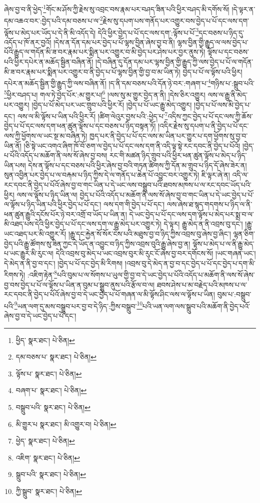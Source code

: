 ཞེས་བྱ་བ་ནི་ཕྱེད་\footnote{ཕྱིད་  སྣར་ཐང་།  པེ་ཅིན། }གོང་མ་ཤོས་ཀྱི་རྗེས་སུ་འབྲང་བས་རྣམ་པར་བཤད་ཟིན་པའི་ཕྱིར་བཤད་མི་དགོས་སོ། །དེ་ལྟར་ན་དམ་འཆའ་བར་:བྱེད་པའི་དམ་བཅས་པ་ལ་\footnote{དམ་བཅས་པ་  སྣར་ཐང་།  པེ་ཅིན། }རྗེས་སུ་དཔག་པས་གནོད་པར་འགྱུར་བས་བྱེད་པ་པོ་དང་ལས་དག་ལྟོས་པ་མེད་པར་ཡོད་པ་དེ་ནི་མི་འདོད་དེ། དེའི་ཕྱིར་བྱེད་པ་པོ་དང་ལས་དག་:ལྟོས་པ་པོ་\footnote{ལྟོས་པ་  སྣར་ཐང་།  པེ་ཅིན། }དང་བཅས་པ་ཉིད་དུ་འདོད་པ་ཁོ་ནར་བྱའོ། །དེས་ན་དོན་དམ་པར་བྱེད་པ་པོ་ལྷས་བྱིན་ཞེས་བྱ་བ་ནི། ལྷས་བྱིན་གྱི་རྒྱུད་ལ་ལས་བྱེད་པ་པོའི་རྒྱུད་ལ་གདོན་མི་ཟ་བར་རྣམ་པར་སྨིན་པར་འགྱུར་བ་མི་བྱེད་པར་ཤེས་པར་བྱར་ནུས་ཏེ། ལྟོས་པ་དང་བཅས་པའི་ཕྱིར་དཔེར་ན་མཆོད་སྦྱིན་བཞིན་ནོ། །དེ་བཞིན་དུ་དོན་དམ་པར་ལྷས་བྱིན་གྱི་རྒྱུད་ཀྱི་ལས་བྱེད་པ་པོ་ལ་གདོན་མི་ཟ་བར་རྣམ་པར་སྨིན་པར་འགྱུར་བ་ནི་བྱེད་པ་པོ་ལྷས་བྱིན་གྱི་བྱ་བ་མ་ཡིན་ཏེ། བྱེད་པ་པོ་ལ་ལྟོས་པའི་ཕྱིར། དཔེར་ན་མཆོད་སྦྱིན་གྱི་རྒྱུད་ཀྱི་ལས་བཞིན་ནོ། །ད་ནི་དམ་བཅས་པའི་དོན་ཉེ་བར་:གཞག་པ་\footnote{བཞག་པ་  སྣར་ཐང་།  པེ་ཅིན། }གཉིས་པ་:སྒྲུབ་པའི་\footnote{བསྒྲུབ་པའི་  སྣར་ཐང་།  པེ་ཅིན། }ཕྱིར་བཤད་པ། གལ་ཏེ་བྱེད་པོར་:མ་གྱུར་པ།\footnote{མི་གྱུར་པ  སྣར་ཐང་། མི་འགྱུར་བ།  པེ་ཅིན། } །ལས་སུ་མ་གྱུར་བྱེད་ན་ནི། །དེས་ཅིར་འགྱུར། ལས་ལ་རྒྱུ་ནི་མེད་པར་འགྱུར། །བྱེད་པ་པོ་མེད་པར་ཡང་གྲུབ་པའི་ཕྱིར་རོ། །བྱེད་པ་པོ་ཡང་རྒྱུ་མེད་འགྱུར། །བྱེད་པ་པོ་ལས་མི་བྱེད་པ་དང་། ལས་ལ་མི་ལྟོས་པ་ཡིན་པའི་ཕྱིར་རོ། །ཚིག་ལེའུར་བྱས་པའི་:ཕྱེད་པ་\footnote{ཕྱེད་  སྣར་ཐང་།  པེ་ཅིན། }འདིས་ཀྱང་བྱེད་པ་པོ་དང་ལས་ཀྱི་ཆོས་བྱེད་པ་པོ་དང་ལས་དག་ཕན་ཚུན་ལྟོས་པ་དང་བཅས་པ་ཉིད་བསྟན་ཏོ། །འདིར་རྗེས་སུ་དཔག་པ་ནི་བྱེད་པ་པོ་དང་ལས་ཀྱི་ཕྱོགས་ལ་ཡང་སྔ་མ་བཞིན་ཏེ། ཁྱད་པར་ནི་བྱེད་པ་པོ་དང་ལས་མ་ཡིན་པར་གྱུར་པ་དག་ཕྱོགས་སུ་བྱ་བ་ཡིན་ནོ། །ཅི་སྟེ་ཡང་འགའ་ཞིག་ཁོ་བོ་ཅག་ལ་བྱེད་པ་པོ་དང་ལས་དག་ནི་འདི་ལྟ་སྟེ་རང་དབང་ནི་བྱེད་པ་པོའོ། །བྱེད་པ་པོའི་འདོད་པ་མཆོག་ནི་ལས་སོ་ཞེས་བྱ་བས། རང་གི་མཚན་ཉིད་གྲུབ་པའི་ཕྱིར་ཕན་ཚུན་ལྟོས་པ་མེད་པ་ཉིད་ཡིན་པས། དེས་ན་ལྟོས་པ་དང་བཅས་པའི་ཕྱིར་ཞེས་བྱ་བའི་གཏན་ཚིགས་ཀྱི་དོན་མ་གྲུབ་པ་ཉིད་དོ་ཞེས་ཟེར་ན། སུན་འབྱིན་པར་བྱེད་པ་ལ་བརྐམ་པ་ཉིད་ཀྱིས་དེ་ལ་གནོད་པ་ཆེན་པོ་འབྱུང་བར་འགྱུར་ཏེ། ཇི་ལྟར་ཞེ་ན། འདི་ལ་རང་དབང་ནི་བྱེད་པ་པོའོ་ཞེས་བྱ་བ་གང་ཡིན་པ་དེ་ཡང་ལས་བསྒྲུབ་པའི་ཐབས་མཁས་པ་ལ་རང་དབང་ཡོད་པའི་ཕྱིར། ལས་ལ་ལྟོས་པ་ཉིད་ཡིན་ལ། བྱེད་པ་པོའི་འདོད་པ་མཆོག་ནི་ལས་སོ་ཞེས་བྱ་བ་གང་ཡིན་པ་དེ་ཡང་བྱེད་པ་པོ་ལ་ལྟོས་པ་ཉིད་ཡིན་པའི་ཕྱིར་བྱེད་པ་པོ་དང་། ལས་དག་གི་བྱེད་པ་པོ་དང་། ལས་ཞེས་ཐ་སྙད་གདགས་པ་ཉིད་ལ་ནི་ཕན་ཚུན་རྒྱུའི་དངོས་པོར་ཉེ་བར་འགྲོ་བ་ཡོད་པ་ཡིན་ན། དེ་ཡང་བྱེད་པ་པོ་དང་ལས་དག་ལྟོས་པ་མེད་པར་སྨྲ་བ་ལ་མི་འཐད་པས་དེའི་ཕྱིར་བྱེད་པ་པོ་དང་ལས་དག་ལ་རྒྱུ་མེད་པར་འགྱུར་ཏེ། དེ་ལྟར། རྒྱུ་མེད་ན་ནི་འབྲས་བུ་དང་། །རྒྱུ་ཡང་འཐད་པར་མི་འགྱུར་རོ། །རྒྱུ་དང་རྐྱེན་སོ་སོར་ངེས་པའི་མཐུས་བྱ་བ་ཉིད་ཀྱིས་འབྲས་བུ་ཞེས་བྱ་ཞིང་། ལྷན་ཅིག་བྱེད་པའི་རྒྱུ་ཚོགས་སུ་ཟིན་ཀྱང་དེ་ཡོད་ན་འབྱུང་བ་ཉིད་ཀྱིས་འབྲས་བུའི་རྒྱུ་ཞེས་བྱ་ན། ལྟོས་པ་མེད་པ་ལ་ནི་རྒྱུ་མེད་པ་ཡང་རྒྱུར་མི་རུང་ལ། དེའི་འབྲས་བུ་མེད་པ་ཡང་འབྲས་བུར་མི་རུང་ངོ་ཞེས་བྱ་བར་དགོངས་སོ། །ཡང་གཞན་ཡང་། དེ་མེད་ན་ནི་བྱ་བ་དང་། །བྱེད་པ་པོ་དང་བྱེད་མི་རིགས། །འབྲས་བུ་དེ་མེད་ན་བྱ་བ་དང་བྱེད་པ་པོ་དང་བྱེད་པ་དག་མི་རིགས་ཏེ། :འཇིག་རྟེན་\footnote{འཇིག་  སྣར་ཐང་།  པེ་ཅིན། }པའི་བུམ་པ་ལ་སོགས་པ་ཡུལ་གྱི་བྱ་བ་དེ་ཡང་བྱེད་པ་པོའི་འདོད་པ་མཆོག་ནི་ལས་སོ་ཞེས་བྱ་བས་བྱེད་པ་པོ་ལ་ལྟོས་པ་ཡིན་ན་བུམ་པ་སྒྲུབ་ནུས་པའི་རྩོལ་བ་ལ། ཐབས་ཤེས་པ་མ་བརྗེད་པའི་མཁས་པ་ལ་རང་དབང་ནི་བྱེད་པ་པོའོ་ཞེས་བྱ་བ་དེ་ཡང་བྱེད་པ་པོ་གཞན་ལ་མི་ལྟོས་ཤིང་ལས་ལ་ལྟོས་པ་ཡིན། བུམ་པ་:བསྒྲུབ་པའི་\footnote{སྒྲུབ་པའི་  སྣར་ཐང་།  པེ་ཅིན། }ཡན་ལག་དུ་མས་བསྒྲུབ་པར་བྱ་བ་དེ་ཉིད་:ཀྱིས་བསྒྲུབ་\footnote{ཀྱི་སྒྲུབ་  སྣར་ཐང་།  པེ་ཅིན། }པའི་ཡན་ལག་ལས་སྒྲུབ་པའི་མཆོག་ནི་བྱེད་པའོ་ཞེས་བྱ་བ་དེ་ཡང་བྱེད་པ་པོ་དང་། 